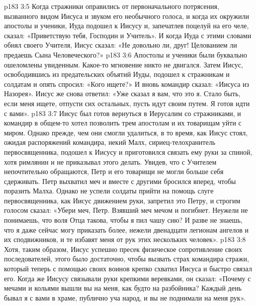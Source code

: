 \vs p183 3:5 Когда стражники оправились от первоначального потрясения, вызванного видом Иисуса и звуком его необычного голоса, и когда их окружили апостолы и ученики, Иуда подошел к Иисусу и, запечатлев поцелуй на его челе, сказал: «Приветствую тебя, Господин и Учитель». И когда Иуда с этими словами обнял своего Учителя, Иисус сказал: «Не довольно ли, друг! Целованием ли предаешь Сына Человеческого?»
\vs p183 3:6 Апостолы и ученики были буквально ошеломлены увиденным. Какое\hyp{}то мгновение никто не двигался. Затем Иисус, освободившись из предательских объятий Иуды, подошел к стражникам и солдатам и опять спросил: «Кого ищете?» И вновь командир сказал: «Иисуса из Назорея». Иисус же снова ответил: «Уже сказал я вам, что это я. Стало быть, если меня ищете, отпусти сих остальных, пусть идут своим путем. Я готов идти с вами».
\vs p183 3:7 Иисус был готов вернуться в Иерусалим со стражниками, и командир в общем\hyp{}то хотел позволить трем апостолам и их товарищам уйти с миром. Однако прежде, чем они смогли удалиться, в то время, как Иисус стоял, ожидая распоряжений командира, некий Малх, сириец\hyp{}телохранитель первосвященника, подошел к Иисусу и приготовился связать ему руки за спиной, хотя римлянин и не приказывал этого делать. Увидев, что с Учителем непочтительно обращаются, Петр и его товарищи не могли больше себя сдерживать. Петр выхватил меч и вместе с другими бросился вперед, чтобы поразить Малха. Однако не успели солдаты прийти на помощь слуге первосвященника, как Иисус движением руки, запретил это Петру, и строгим голосом сказал: «Убери меч, Петр. Взявший меч мечом и погибнет. Неужели не понимаешь, что воля Отца такова, чтобы я пил чашу сию? И разве не знаешь, что я даже сейчас могу приказать более, нежели двенадцати легионам ангелов и их сподвижников, и те избавят меня от рук этих нескольких человек».
\vs p183 3:8 Хотя, таким образом, Иисус успешно пресек физическое сопротивление своих последователей, этого было достаточно, чтобы вызвать страх командира стражи, который теперь с помощью своих воинов крепко схватил Иисуса и быстро связал его. Когда же Иисусу связывали руки крепкими веревками, он сказал: «Почему с мечами и кольями вышли вы на меня, как будто на разбойника? Каждый день бывал я с вами в храме, публично уча народ, и вы не поднимали на меня рук».

